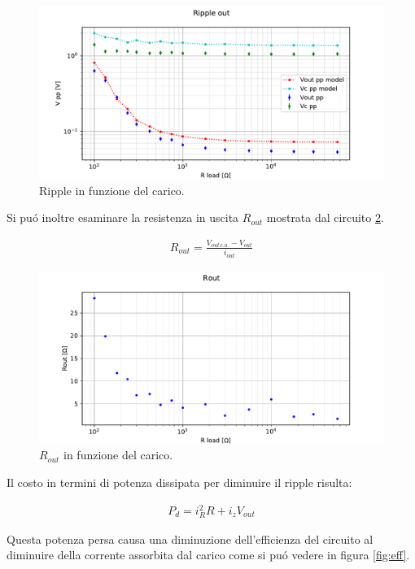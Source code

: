 \begin{figure}[h]
\centering
\includegraphics[width=\textwidth]{fig5.pdf}
\caption{Ripple in funzione del carico.}
\label{fig:vdiodpp}
\end{figure}

Si pu\'o inoltre esaminare la resistenza in uscita $R_{out}$ mostrata dal circuito \ref{fig:rout}.

\begin{gather}
	R_{out} = \frac{V_{out\, c.a.} - V_{out}}{i_{out}}
\end{gather}

\begin{figure}[H]
\centering
\includegraphics[width=\textwidth]{fig6.pdf}
\caption{$R_{out}$ in funzione del carico.}
\label{fig:rout}
\end{figure}

Il costo in termini di potenza dissipata per diminuire il ripple risulta:

\begin{gather}
	P_d = i_R^2 R + i_z V_{out}
\end{gather}

Questa potenza persa causa una diminuzione dell'efficienza del circuito al diminuire della corrente assorbita dal carico come si pu\'o vedere in figura \ref{fig:eff}.

